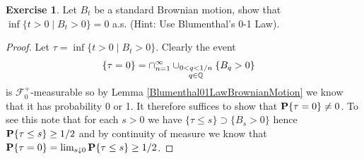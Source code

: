 \documentclass{amsart}
\theoremstyle{remark}
\theoremstyle{definition}
\newtheorem{ex}[thm]{Exercise}
\begin{document}
\begin{ex}Let $B_t$ be a standard Brownian motion, show that $\inf
  \lbrace t > 0 \mid B_t > 0 \rbrace = 0$ a.s.  (Hint: Use
  Blumenthal's 0-1 Law).
\end{ex}
\begin{proof}
Let $\tau = \inf \lbrace t > 0 \mid B_t > 0 \rbrace$.  Clearly the
event 
\begin{align*}
\lbrace \tau = 0 \rbrace &= \cap_{n=1}^\infty \cup_{\substack{0 < q <
    1/n\\ q \in \mathbb{Q}}} \lbrace B_q > 0 \rbrace
\end{align*}
is  $\mathcal{F}^+_0$-measurable so by Lemma
  \ref{Blumenthal01LawBrownianMotion} we know that it has probability
  0 or 1.  It therefore suffices to show that $\textbf{P}\{ \tau =
    0\} \neq 0$.  To see this note that for each $s > 0$ we have
$\lbrace \tau \leq s \rbrace \supset \lbrace B_s > 0 \rbrace$ hence
$\textbf{P}\{\tau \leq s\} \geq 1/2$ and by continuity of measure we
know that $\textbf{P}\{\tau = 0\} = \lim_{s \downarrow 0} \textbf{P}\{\tau \leq s\} \geq 1/2$.
\end{proof}
\end{document}
